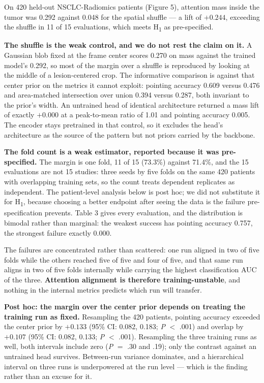 \documentclass[11pt]{article}
\begin{document}
On 420 held-out NSCLC-Radiomics patients (Figure 5), attention mass inside the
tumor was 0.292 against 0.048 for the spatial shuffle --- a lift of $+0.244$,
exceeding the shuffle in 11 of 15 evaluations, which meets H\textsubscript{1} as
pre-specified.

\textbf{The shuffle is the weak control, and we do not rest the claim on it.} A
Gaussian blob fixed at the frame center scores 0.270 on mass against the trained
model's 0.292, so most of the margin over a shuffle is reproduced by looking at
the middle of a lesion-centered crop. The informative comparison is against that
center prior on the metrics it cannot exploit: pointing accuracy 0.609 versus
0.476 and area-matched intersection over union 0.394 versus 0.287, both invariant
to the prior's width. An untrained head of identical architecture returned a mass
lift of exactly $+0.000$ at a peak-to-mean ratio of 1.01 and pointing accuracy
0.005. The encoder stays pretrained in that control, so it excludes the head's
architecture as the source of the pattern but not priors carried by the backbone.

\textbf{The fold count is a weak estimator, reported because it was
pre-specified.} The margin is one fold, 11 of 15 (73.3\%) against 71.4\%, and the
15 evaluations are not 15 studies: three seeds by five folds on the same 420
patients with overlapping training sets, so the count treats dependent replicates
as independent. The patient-level analysis below is post hoc; we did not
substitute it for H\textsubscript{1}, because choosing a better endpoint after
seeing the data is the failure pre-specification prevents. Table 3 gives every
evaluation, and the distribution is bimodal rather than marginal: the weakest
success has pointing accuracy 0.757, the strongest failure exactly 0.000.

The failures are concentrated rather than scattered: one run aligned in two of five
folds while the others reached five of five and four of five, and that same run
aligns in two of five folds internally while carrying the highest classification
AUC of the three. \textbf{Attention alignment is therefore training-unstable}, and
nothing in the internal metrics predicts which run will transfer.

\textbf{Post hoc: the margin over the center prior depends on treating the
training run as fixed.} Resampling the 420 patients, pointing accuracy exceeded
the center prior by $+0.133$ (95\% CI: 0.082, 0.183; \textit{P} $<$ .001) and
overlap by $+0.107$ (95\% CI: 0.082, 0.133; \textit{P} $<$ .001). Resampling the
three training runs as well, both intervals include zero (\textit{P} $=$ .30 and
.19); only the contrast against an untrained head survives. Between-run variance
dominates, and a hierarchical interval on three runs is underpowered at the run
level --- which is the finding rather than an excuse for it.
\end{document}
